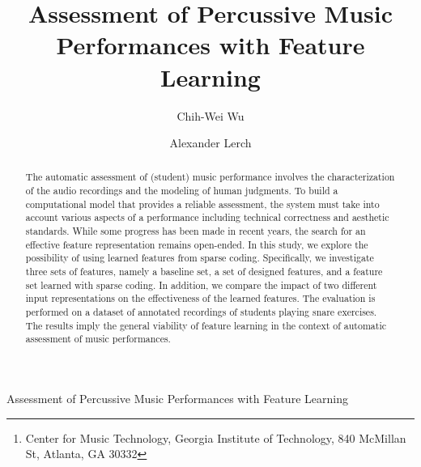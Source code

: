 \documentclass{ws-ijsc}
\begin{document}
{Assessment of Percussive Music Performances with Feature Learning}

%
\catchline{}{}{}{}{}
%

\title{Assessment of Percussive Music Performances with Feature Learning}


\author{Chih-Wei Wu}

\address{Center for Music Technology\\
Georgia Institute of Technology\,\footnote{Center for Music Technology, Georgia Institute of Technology, 840 McMillan St, Atlanta, GA 30332}\\
}

\author{Alexander Lerch}

\address{Center for Music Technology\\
Georgia Institute of Technology\\
alexander.lerch@gatech.edu
}

\maketitle

\begin{history}
\end{history}

\begin{abstract}
The automatic assessment of (student) music performance involves the characterization of the audio recordings and the modeling of human judgments. To build a computational model that provides a reliable assessment, the system must take into account various aspects of a performance including technical correctness and aesthetic standards. While some progress has been made in recent years, the search for an effective feature representation remains open-ended. In this study, we explore the possibility of using learned features from sparse coding. Specifically, we investigate three sets of features, namely a baseline set, a set of designed features, and a feature set learned with sparse coding. In addition, we compare the impact of two different input representations on the effectiveness of the learned features. The evaluation is performed on a dataset of annotated recordings of students playing snare exercises. The results imply the general viability of feature learning in the context of automatic assessment of music performances.   
\end{abstract}
\end{document}
